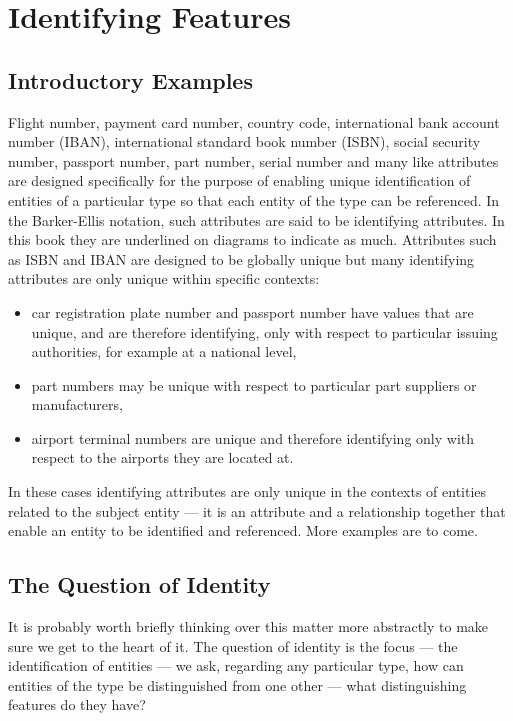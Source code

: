 \section{Identifying Features}
\label{IdentifyingFeatures}

\subsection{Introductory Examples}

\mynote
Flight number, payment card number, country code, international bank account number (IBAN), 
international standard book number (ISBN), social security number, passport number, part number, serial number and many like attributes are designed specifically for the purpose of enabling unique identification of entities of a particular type so that each entity of the type can be referenced. 
In the Barker-Ellis notation, such attributes are said to be identifying attributes. In this book they are underlined 
on diagrams to indicate as much. 
Attributes such as ISBN and IBAN are designed to be globally unique but many identifying attributes are only unique within specific contexts:
\begin{itemize}
\item
car registration plate number and passport number have values that are unique, and are therefore identifying, only with respect to particular issuing authorities, for example at a national level,
\item part numbers may be unique with respect to particular part suppliers or manufacturers,
\item airport terminal numbers are unique and therefore identifying only with respect to the airports they are located at.
\end{itemize}
In these cases identifying attributes are only unique in the contexts of entities related to the subject entity --- it is an attribute and a relationship together that enable an entity to be identified and referenced. More examples are to come.

\subsection{The Question of Identity}
\mynote
It is probably worth briefly thinking over this matter more abstractly to make sure we get to the heart of it. The question of identity is the focus --- the identification of entities ---  we ask, regarding any particular type, how can entities of the type be distinguished from one other 
--- what distinguishing features do they have? 


